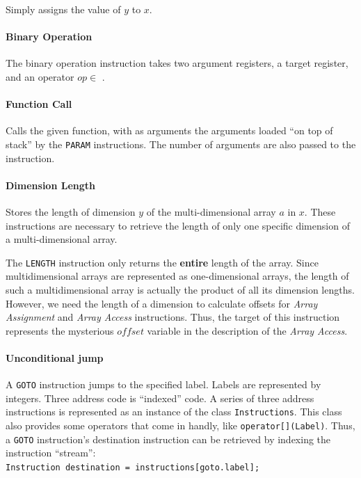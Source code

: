 \documentclass[a4paper]{article}
\begin{document}
Simply assigns the value of $y$ to $x$.

\paragraph{Binary Operation\\}

The binary operation instruction takes two argument registers, a target
register, and an operator $op \in$ \varset{$+$,$-$,$\times$,$\div$}.

\paragraph{Function Call\\}

Calls the given function, with as arguments the arguments loaded ``on top of
stack'' by the \texttt{PARAM} instructions. The number of arguments are also
passed to the instruction.

\paragraph{Dimension Length\\}

Stores the length of dimension $y$ of the multi-dimensional array $a$ in $x$.
These instructions are necessary to retrieve the length of only one specific
dimension of a multi-dimensional array.

The \texttt{LENGTH} instruction only returns the \textbf{entire} length of
the array. Since multidimensional arrays are represented as one-dimensional arrays,
the length of such a multidimensional array is actually the product of all its
dimension lengths. However, we need the length of a dimension to calculate
offsets for \textsl{Array Assignment} and \textsl{Array Access} instructions.
Thus, the target of this instruction represents the mysterious $offset$
variable in the description of the \textsl{Array Access}.

\paragraph{Unconditional jump\\}

A \texttt{GOTO} instruction jumps to the specified label. Labels are represented by
integers. Three address code is ``indexed'' code. A series of three address
instructions is represented as an instance of the class \texttt{Instructions}.
This class also provides some operators that come in handly, like
\texttt{operator[](Label)}. Thus, a \texttt{GOTO} instruction's destination
instruction can be retrieved by indexing the instruction ``stream'':\\
\texttt{Instruction destination = instructions[goto.label];}
\end{document}

